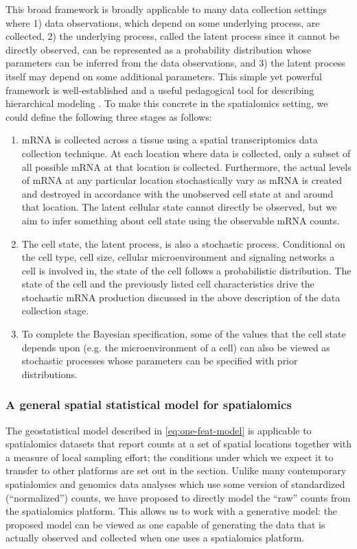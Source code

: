 \documentclass[10pt,letterpaper]{article}
\begin{document}
This broad framework is broadly applicable to many data collection settings where 1) data observations, which depend on some underlying process, are collected, 2) the underlying process, called the latent process since it cannot be directly observed, can be represented as a probability distribution whose parameters can be inferred from the data observations, and 3) the latent process itself may depend on some additional parameters. This simple yet powerful framework is well-established and a useful pedagogical tool for describing hierarchical modeling \cite{cressie2011statistics}. To make this concrete in the spatialomics setting, we could define the following three stages as follows:
\begin{enumerate}
    \item mRNA is collected across a tissue using a spatial transcriptomics data collection technique. At each location where data is collected, only a subset of all possible mRNA at that location is collected. Furthermore, the actual levels of mRNA at any particular location stochastically vary as mRNA is created and destroyed in accordance with the unobserved cell state at and around that location. The latent cellular state cannot directly be observed, but we aim to infer something about cell state using the observable mRNA counts.
    \item The cell state, the latent process, is also a stochastic process. Conditional on the cell type, cell size, cellular microenvironment and signaling networks a cell is involved in, the state of the cell follows a probabilistic distribution. The state of the cell and the previously listed cell characteristics drive the stochastic mRNA production discussed in the above description of the data collection stage.
    \item To complete the Bayesian specification, some of the values that the cell state depends upon (e.g. the microenvironment of a cell) can also be viewed as stochastic processes whose parameters can be specified with prior distributions.
\end{enumerate}

\subsubsection*{A general spatial statistical model for spatialomics}

The geostatistical model described in \eqref{eq:one-feat-model} is applicable to spatialomics datasets that report counts at a set of spatial locations together with a measure of local sampling effort; the conditions under which we expect it to transfer to other platforms are set out in the  section. Unlike many contemporary spatialomics and genomics data analyses which use some version of standardized (``normalized'') counts, we have proposed to directly model the ``raw'' counts from the spatialomics platform. This allows us to work with a generative model: the proposed model can be viewed as one capable of generating the data that is actually observed and collected when one uses a spatialomics platform.
\end{document}
